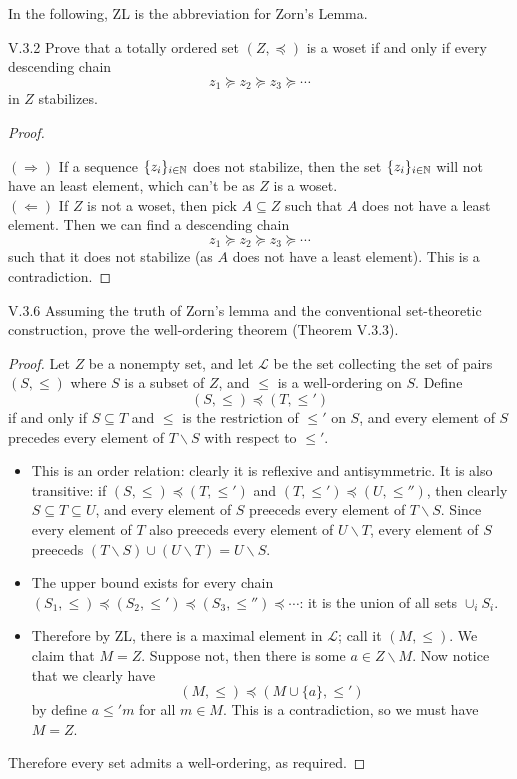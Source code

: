 \section{}

In the following, ZL is the abbreviation for Zorn's Lemma.

\begin{problem}{V.3.2}
Prove that a totally ordered set $(Z, \preceq)$ is a woset if and only if every descending chain
\[
z_1 \succeq z_2 \succeq z_3 \succeq \cdots
\]
in $Z$ stabilizes.
\end{problem}
\begin{proof} \

\noindent $(\Rightarrow)$ If a sequence $\{z_i\}_{i \in \mathbb{N}}$ does not stabilize, then the set $\{z_i\}_{i \in \mathbb{N}}$ will not have an least element, which can't be as $Z$ is a woset. \\
$(\Leftarrow)$ If $Z$ is not a woset, then pick $A \subseteq Z$ such that $A$ does not have a least element. Then we can find a descending chain
\[
z_1 \succeq z_2 \succeq z_3 \succeq \cdots
\]
such that it does not stabilize (as $A$ does not have a least element). This is a contradiction.
\end{proof}

\begin{problem}{V.3.6}
Assuming the truth of Zorn's lemma and the conventional set-theoretic construction, prove the well-ordering theorem (Theorem V.3.3).
\end{problem}
\begin{proof}
Let $Z$ be a nonempty set, and let $\mathscr{L}$ be the set collecting the set of pairs $(S,\leq)$ where $S$ is a subset of $Z$, and $\leq$ is a well-ordering on $S$. Define
\[
(S,\leq) \preceq (T,\leq')
\]
if and only if $S \subseteq T$ and $\leq$ is the restriction of $\leq'$ on $S$, and every element of $S$ precedes every element of $T \backslash S$ with respect to $\leq'$.
\begin{itemize}
	\setlength\itemsep{0pt}
	\item This is an order relation: clearly it is reflexive and antisymmetric. It is also transitive: if $(S,\leq) \preceq (T,\leq')$ and $(T,\leq') \preceq (U,\leq'')$, then clearly $S \subseteq T \subseteq U$, and every element of $S$ preeceds every element of $T \backslash S$. Since every element of $T$ also preeceds every element of $U \backslash T$, every element of $S$ preeceds $(T \backslash S) \cup (U \backslash T) = U \backslash S$.
	\item The upper bound exists for every chain $(S_1,\leq) \preceq (S_2,\leq') \preceq (S_3,\leq'') \preceq \cdots$: it is the union of all sets $\cup_{i} S_i$.  
	\item Therefore by ZL, there is a maximal element in $\mathscr{L}$; call it $(M, \leq)$. We claim that $M = Z$. Suppose not, then there is some $a \in Z \backslash M$. Now notice that we clearly have
	\[
	(M, \leq) \preceq (M \cup \{a\}, \leq')
	\]
	by define $a \leq' m$ for all $m \in M$. This is a contradiction, so we must have $M = Z$.
\end{itemize}
Therefore every set admits a well-ordering, as required.
\end{proof}

